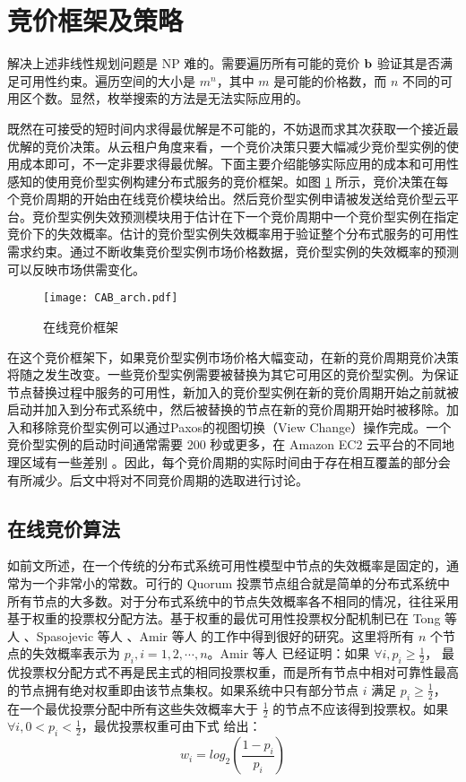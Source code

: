 \section{竞价框架及策略}
\label{jupiter-framework}
解决上述非线性规划问题是 NP 难的。需要遍历所有可能的竞价 $\bf b$ 验证其是否满足可用性约束。遍历空间的大小是 $m^n$，其中 $m$ 是可能的价格数，而 $n$ 不同的可用区个数。显然，枚举搜索的方法是无法实际应用的。

既然在可接受的短时间内求得最优解是不可能的，不妨退而求其次获取一个接近最优解的竞价决策。从云租户角度来看，一个竞价决策只要大幅减少竞价型实例的使用成本即可，不一定非要求得最优解。下面主要介绍能够实际应用的成本和可用性感知的使用竞价型实例构建分布式服务的竞价框架。如图 \ref{figure:framework} 所示，竞价决策在每个竞价周期的开始由在线竞价模块给出。然后竞价型实例申请被发送给竞价型云平台。竞价型实例失效预测模块用于估计在下一个竞价周期中一个竞价型实例在指定竞价下的失效概率。估计的竞价型实例失效概率用于验证整个分布式服务的可用性需求约束。通过不断收集竞价型实例市场价格数据，竞价型实例的失效概率的预测可以反映市场供需变化。
\begin{figure}
  \centering
  \texttt{[image: CAB\_arch.pdf]}
  \caption{在线竞价框架}
  \label{figure:framework}
\end{figure}

在这个竞价框架下，如果竞价型实例市场价格大幅变动，在新的竞价周期竞价决策将随之发生改变。一些竞价型实例需要被替换为其它可用区的竞价型实例。为保证节点替换过程中服务的可用性，新加入的竞价型实例在新的竞价周期开始之前就被启动并加入到分布式系统中，然后被替换的节点在新的竞价周期开始时被移除。加入和移除竞价型实例可以通过Paxos的视图切换（View Change）操作完成。一个竞价型实例的启动时间通常需要 200 秒或更多，在 Amazon EC2 云平台的不同地理区域有一些差别 \cite{Mao:2012:PSV:2353730.2353859}。因此，每个竞价周期的实际时间由于存在相互覆盖的部分会有所减少。后文中将对不同竞价周期的选取进行讨论。

\subsection{在线竞价算法}
\label{subsec:jupiter-bidding}
如前文所述，在一个传统的分布式系统可用性模型中节点的失效概率是固定的，通常为一个非常小的常数。可行的 Quorum 投票节点组合就是简单的分布式系统中所有节点的大多数。对于分布式系统中的节点失效概率各不相同的情况，往往采用基于权重的投票权分配方法。基于权重的最优可用性投票权分配机制已在 Tong 等人 \cite{25789}、Spasojevic 等人 \cite{262589}、Amir 等人 \cite{Amir1998223} 的工作中得到很好的研究。这里将所有 $n$ 个节点的失效概率表示为 $p_i, i = 1, 2, \cdots, n$。Amir 等人 \cite{Amir1998223} 已经证明：如果 $\forall i, p_i \geq \frac{1}{2}$， 最优投票权分配方式不再是民主式的相同投票权重，而是所有节点中相对可靠性最高的节点拥有绝对权重即由该节点集权。如果系统中只有部分节点 $i$ 满足 $p_i \geq \frac{1}{2}$， 在一个最优投票分配中所有这些失效概率大于 $\frac{1}{2}$ 的节点不应该得到投票权。如果 $\forall i, 0 < p_i < \frac{1}{2}$，最优投票权重可由下式 \cite{262589, 25789}给出：
\begin{equation}\label{eq_ow}
w_i = log_2(\frac{1-p_i}{p_i})
\end{equation}

